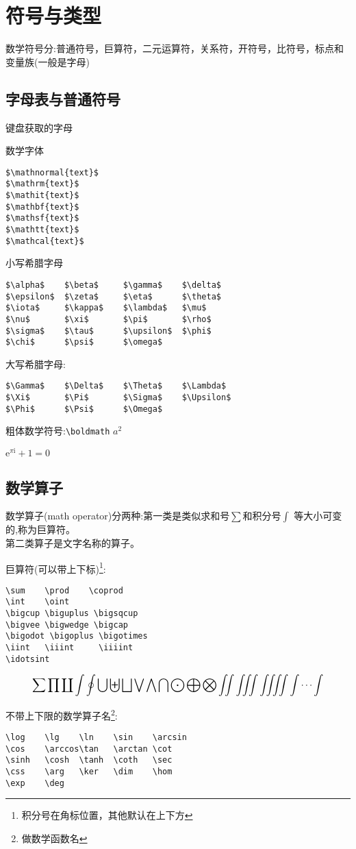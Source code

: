 \documentclass[titlepage, hyperref, UTF8]{ctexart}
\begin{document}
\section{符号与类型}
数学符号分:普通符号，巨算符，二元运算符，关系符，开符号，比符号，标点和变量族(一般是字母)
\subsection{字母表与普通符号}
键盘获取的字母

数学字体
\begin{verbatim}
$\mathnormal{text}$
$\mathrm{text}$
$\mathit{text}$
$\mathbf{text}$
$\mathsf{text}$
$\mathtt{text}$
$\mathcal{text}$
\end{verbatim}

小写希腊字母
\begin{verbatim}
$\alpha$	$\beta$		$\gamma$	$\delta$
$\epsilon$	$\zeta$		$\eta$		$\theta$
$\iota$		$\kappa$	$\lambda$	$\mu$
$\nu$		$\xi$		$\pi$		$\rho$
$\sigma$	$\tau$		$\upsilon$	$\phi$
$\chi$		$\psi$		$\omega$	
\end{verbatim}

大写希腊字母:
\begin{verbatim}
$\Gamma$	$\Delta$	$\Theta$	$\Lambda$
$\Xi$		$\Pi$		$\Sigma$	$\Upsilon$
$\Phi$		$\Psi$		$\Omega$
\end{verbatim}

粗体数学符号:\verb|\boldmath|
{\boldmath $a^2$}

\newcommand{\mi}{\mathrm i}
\newcommand{\me}{\mathrm e}
$\me^{\pi \mathrm i} + 1 = 0$

\subsection{数学算子}
数学算子(math operator)分两种:第一类是类似求和号$\sum$和积分号$\int$
等大小可变的,称为巨算符。\\
第二类算子是文字名称的算子。

巨算符(可以带上下标)\footnote{积分号在角标位置，其他默认在上下方}:
\begin{verbatim}
\sum    \prod    \coprod
\int    \oint    
\bigcup \biguplus \bigsqcup
\bigvee \bigwedge \bigcap
\bigodot \bigoplus \bigotimes
\iint   \iiint     \iiiint
\idotsint
\end{verbatim}
\[
\sum    \prod    \coprod
\int    \oint    
\bigcup \biguplus \bigsqcup
\bigvee \bigwedge \bigcap
\bigodot \bigoplus \bigotimes
\iint   \iiint     \iiiint
\idotsint
\]

不带上下限的数学算子名\footnote{做数学函数名}:
\begin{verbatim}
\log    \lg    \ln    \sin    \arcsin
\cos    \arccos\tan   \arctan \cot
\sinh   \cosh  \tanh  \coth   \sec
\css    \arg   \ker   \dim    \hom
\exp    \deg
\end{verbatim}
\end{document}
